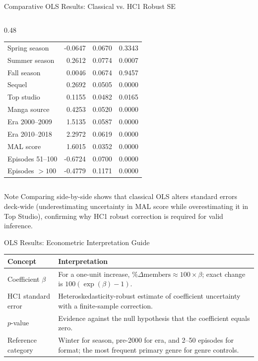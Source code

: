 \documentclass[aspectratio=169,11pt]{beamer}
\begin{document}
\begin{frame}{Comparative OLS Results: Classical vs. HC1 Robust SE}
\begin{columns}[T]
\begin{column}{0.48\textwidth}
{\begin{tabular}{lrrr}
          Spring season & -0.0647 & 0.0670 & 0.3343 \\
          Summer season & 0.2612 & 0.0774 & 0.0007 \\
          Fall season & 0.0046 & 0.0674 & 0.9457 \\
          Sequel & 0.2692 & 0.0505 & 0.0000 \\
          Top studio & 0.1155 & 0.0482 & 0.0165 \\
          Manga source & 0.4253 & 0.0520 & 0.0000 \\
          Era 2000--2009 & 1.5135 & 0.0587 & 0.0000 \\
          Era 2010--2018 & 2.2972 & 0.0619 & 0.0000 \\
          MAL score & 1.6015 & 0.0352 & 0.0000 \\
          Episodes 51--100 & -0.6724 & 0.0700 & 0.0000 \\
          Episodes $>100$ & -0.4779 & 0.1171 & 0.0000 \\
          \bottomrule
        \end{tabular}
      }
    \end{column}
  \end{columns}
  \vspace{-.1cm}
  \begin{block}{Note}
    \tiny
    Comparing side-by-side shows that classical OLS alters standard errors
    deck-wide (underestimating uncertainty in MAL score while overestimating
    it in Top Studio), confirming why HC1 robust correction is required for
    valid inference.
  \end{block}
\end{frame}

\begin{frame}{OLS Results: Econometric Interpretation Guide}
  \begin{table}
    \centering
    \begin{tabular}{p{}p{}}
      \toprule
      Concept & Interpretation \\
      \midrule
      Coefficient $\beta$ & For a one-unit increase,
      $\%\Delta \mathrm{members} \approx 100\times\beta$; exact change is
      $100(\exp(\beta)-1)$. \\
      HC1 standard error & Heteroskedasticity-robust estimate of
      coefficient uncertainty with a finite-sample correction. \\
      $p$-value & Evidence against the null hypothesis that the coefficient
      equals zero. \\
      Reference category & Winter for season, pre-2000 for era, and 2--50
      episodes for format; the most frequent primary genre for genre controls. \\
      \bottomrule
    \end{tabular}
  \end{table}
\end{frame}
\end{document}
